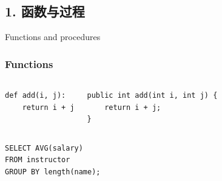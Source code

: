 \documentclass[aspectratio=169, 14pt]{beamer}
\begin{document}
{
    \begin{frame}
        \section{\textcolor{darkmidnightblue}{1. 函数与过程}}
        Functions and procedures
    \end{frame}

}

\begin{frame}[fragile]
    \frametitle{Functions}

    \begin{columns}
        \begin{verbatim}
def add(i, j):
    return i + j
    \end{verbatim}
    \begin{verbatim}
public int add(int i, int j) {
    return i + j;
}
     \end{verbatim} 

    \end{columns}


    \begin{verbatim}
SELECT AVG(salary)
FROM instructor
GROUP BY length(name);
    \end{verbatim}

\end{frame}
\end{document}
